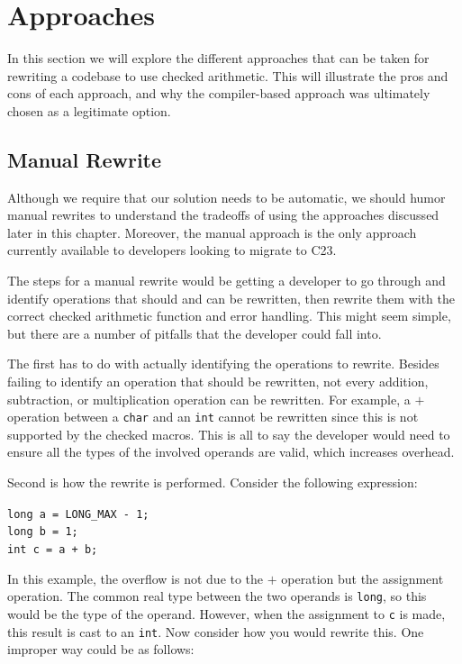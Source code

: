 \section{Approaches}

In this section we will explore the different approaches that can be taken for rewriting a codebase to use checked arithmetic. This will illustrate the pros and cons of each approach, and why the compiler-based approach was ultimately chosen as a legitimate option.

\subsection{Manual Rewrite}

Although we require that our solution needs to be automatic, we should humor manual rewrites to understand the tradeoffs of using the approaches discussed later in this chapter. Moreover, the manual approach is the only approach currently available to developers looking to migrate to C23.

The steps for a manual rewrite would be getting a developer to go through and identify operations that should and can be rewritten, then rewrite them with the correct checked arithmetic function and error handling. This might seem simple, but there are a number of pitfalls that the developer could fall into.

The first has to do with actually identifying the operations to rewrite. Besides failing to identify an operation that should be rewritten, not every addition, subtraction, or multiplication operation can be rewritten. For example, a $+$ operation between a \texttt{char} and an \texttt{int} cannot be rewritten since this is not supported by the checked macros. This is all to say the developer would need to ensure all the types of the involved operands are valid, which increases overhead.

Second is how the rewrite is performed. Consider the following expression:
\begin{flushleft}
\begin{minipage}{\linewidth}
\texttt{long a = LONG\_MAX - 1;\\
long b = 1;\\
int c = a + b;\\
}
\end{minipage}
\end{flushleft}

In this example, the overflow is not due to the $+$ operation but the assignment operation. The common real type between the two operands is \texttt{long}, so this would be the type of the operand. However, when the assignment to \texttt{c} is made, this result is cast to an \texttt{int}. Now consider how you would rewrite this. One improper way could be as follows:

